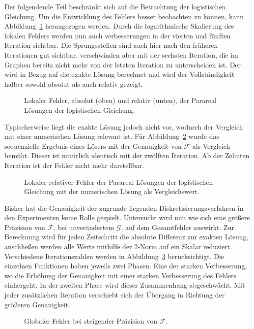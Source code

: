 Der folgendende Teil beschränkt sich auf die Betrachtung der logistischen Gleichung. Um die Entwicklung des Fehlers besser beobachten zu können, kann Abbildung~\ref{fig:iter_error_local} herangezogen werden. Durch die logarithmische Skalierung des lokalen Fehlers werden nun auch verbesserungen in der vierten und fünften Iteration sichtbar. Die Sprungsstellen sind auch hier nach den früheren Iterationen gut sichtbar, verschwinden aber mit der sechsten Iteration, die im Graphen bereits nicht mehr von der letzten Iteration zu unterscheiden ist. Der wird in Bezug auf die exakte Lösung berechnet und wird der Vollständigkeit halber sowohl absolut als auch relativ gezeigt.
\begin{figure}[ht]
    \centering
        
        
    \caption{Lokaler Fehler, absolut (oben) und relativ (unten), der Parareal Lösungen der logistischen Gleichung.}
    \label{fig:iter_error_local}
\end{figure}
Typischerweise liegt die exakte Lösung jedoch nicht vor, wodurch der Vergleich mit einer numerischen Lösung relevant ist. Für Abbildung~\ref{fig:iter_error_local_num} wurde das sequenzielle Ergebnis eines Lösers mit der Genauigkeit von \(\mathcal{F}\) als Vergleich bemüht. Dieser ist natürlich identisch mit der zwölften Iteration. Ab der Zehnten Iteration ist der Fehler nicht mehr darstellbar.\\
\begin{figure}[ht]
    \centering
        
    \caption{Lokaler relativer Fehler der Parareal Lösungen der logistischen Gleichung mit der numerischen Lösung als Vergleichswert.}
    \label{fig:iter_error_local_num}
\end{figure}

Bisher hat die Genauigkeit der zugrunde liegenden Diskretisierungsverfahren in den Experimenten keine Rolle gespielt. Untersucht wird nun wie sich eine größere Präzision von \(\mathcal{F}\), bei unverändertem \(\mathcal{G}\), auf dem Gesamtfehler auswirkt. Zur Berechnung wird für jeden Zeitschritt die absolute Differenz zur exakten Lösung, anschließen werden alle Werte mithilfe der 2-Norm auf ein Skalar reduziert. Verschiedene Iterationszahlen werden in Abbildung~\ref{fig:iter_error} berücksichtigt. Die einzelnen Funktionen haben jeweils zwei Phasen. Eine der starken Verbesserung, wo die Erhöhung der Genauigkeit mit einer starken Verbesserung des Fehlers einhergeht. In der zweiten Phase wird dieser Zusammenhang abgeschwächt. Mit jeder zusätzlichen Iteration verschiebt sich der Übergang in Richtung der größeren Genauigkeit.
\begin{figure}[ht]
    \centering
        
    \caption{Globaler Fehler bei steigender Präzision von \(\mathcal{F}\).}
    \label{fig:iter_error}
\end{figure}

